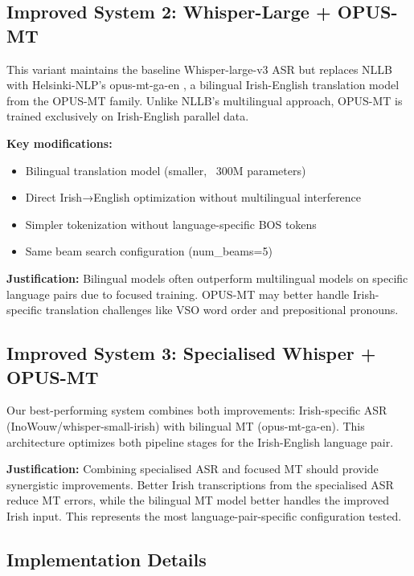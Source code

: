\documentclass[11pt]{article}
\begin{document}
\subsection{Improved System 2: Whisper-Large + OPUS-MT}

This variant maintains the baseline Whisper-large-v3 ASR but replaces NLLB with Helsinki-NLP's opus-mt-ga-en \citep{opus-mt-ga-en}, a bilingual Irish-English translation model from the OPUS-MT family. 
Unlike NLLB's multilingual approach, OPUS-MT is trained exclusively on Irish-English parallel data.

\textbf{Key modifications:}
\begin{itemize}
\item Bilingual translation model (smaller, ~300M parameters)
\item Direct Irish→English optimization without multilingual interference
\item Simpler tokenization without language-specific BOS tokens
\item Same beam search configuration (num\_beams=5)
\end{itemize}

\textbf{Justification:} Bilingual models often outperform multilingual models on specific language pairs due to focused training. OPUS-MT may better handle Irish-specific translation challenges like 
VSO word order and prepositional pronouns.

\subsection{Improved System 3: Specialised Whisper + OPUS-MT}

Our best-performing system combines both improvements: Irish-specific ASR (InoWouw/whisper-small-irish) with bilingual MT (opus-mt-ga-en). This architecture optimizes both pipeline stages for the Irish-English 
language pair.

\textbf{Justification:} Combining specialised ASR and focused MT should provide synergistic improvements. Better Irish transcriptions from the specialised ASR reduce MT errors, while the bilingual 
MT model better handles the improved Irish input. This represents the most language-pair-specific configuration tested.

\subsection{Implementation Details}
\end{document}
